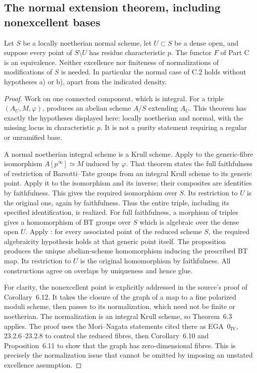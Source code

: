 \subsection{The normal extension theorem, including nonexcellent bases}

\begin{theorem}\label{thm:C-RD6}
Let $S$ be a locally noetherian normal scheme, let $U\subset S$ be a dense
open, and suppose every point of $S\setminus U$ has residue
characteristic $p$. The functor $F$ of Part C is an equivalence.
Neither excellence nor finiteness of normalizations of modifications of
$S$ is needed. In particular the normal case of C.2 holds without
hypotheses a) or b), apart from the indicated density.
\end{theorem}
\begin{proof}
Work on one connected component, which is integral. For a triple
$(A_U,M,\varphi)$, \cite[Corollary~6.12]{KrishnamoorthyPal2021RankTwo}
produces an abelian scheme $A/S$ extending $A_U$. This theorem has
exactly the hypotheses displayed here: locally noetherian and normal,
with the missing locus in characteristic $p$. It is not a purity
statement requiring a regular or unramified base.

A normal noetherian integral scheme is a Krull scheme. Apply
\cite[Theorem~6.3]{KrishnamoorthyPal2021RankTwo} to the generic-fibre
isomorphism $A[p^\infty]\simeq M$ induced by $\varphi$. That theorem
states the full faithfulness of restriction of Barsotti--Tate groups
from an integral Krull scheme to its generic point. Apply it to the
isomorphism and its inverse; their composites are identities by
faithfulness. This gives the required isomorphism over $S$. Its
restriction to $U$ is the original one, again by faithfulness. Thus the
entire triple, including its specified identification, is realized.
For full faithfulness, a morphism of triples gives a homomorphism of
BT groups over $S$ which is algebraic over the dense open $U$. Apply
\cite[Proposition~1.2, p.64]{Grothendieck1966Hom}: for every associated
point of the reduced scheme $S$, the required algebraicity hypothesis
holds at that generic point itself. The proposition produces the unique
abelian-scheme homomorphism inducing the prescribed BT map. Its
restriction to $U$ is the original homomorphism by faithfulness.
All constructions agree on overlaps by uniqueness and hence glue.

For clarity, the nonexcellent point is explicitly addressed in the
source's proof of Corollary~6.12. It takes the closure of the graph of a
map to a fine polarized moduli scheme, then passes to its normalization,
which need not be finite or noetherian. The normalization is an integral
Krull scheme, so Theorem~6.3 applies. The proof uses the Mori--Nagata
statements cited there as EGA~$0_{\mathrm{IV}}$, 23.2.6--23.2.8 to
control the reduced fibres, then Corollary~6.10 and Proposition~6.11 to
show that the graph has zero-dimensional fibres. This is precisely the
normalization issue that cannot be omitted by imposing an unstated
excellence assumption.
\end{proof}

